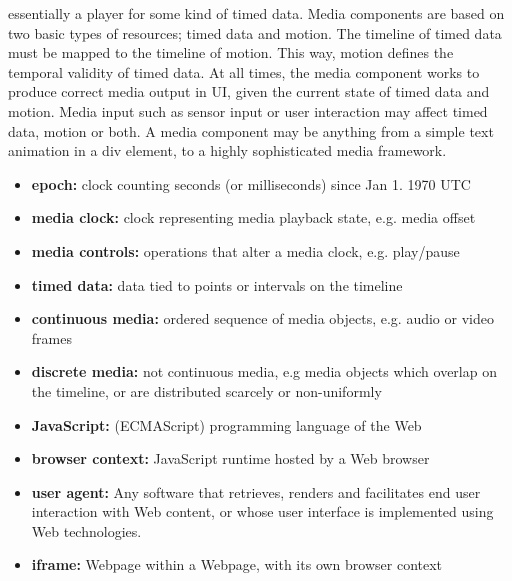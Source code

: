  essentially a player for some kind of timed data. Media components are based on two basic types of resources; timed data and motion. The timeline of timed data must be mapped to the timeline of motion. This way, motion defines the temporal validity of timed data. At all times, the media component works to produce correct media output in UI, given the current state of timed data and motion. Media input such as sensor input or user interaction may affect timed data, motion or both. A media component may be anything from a simple text animation in a div element, to a highly sophisticated media framework.



\begin{itemize}
\item{\textbf{epoch:} clock counting seconds (or milliseconds) since Jan 1. 1970 UTC}
\item{\textbf{media clock:} clock representing media playback state, e.g. media offset}
\item{\textbf{media controls:} operations that alter a media clock, e.g. play/pause}
\item{\textbf{timed data:} data tied to points or intervals on the timeline}
\item{\textbf{continuous media:} ordered sequence of media objects, e.g. audio or video frames}
\item{\textbf{discrete media:} not continuous media, e.g media objects which overlap on the timeline, or are distributed scarcely or non-uniformly}
\item{\textbf{JavaScript:} (ECMAScript) programming language of the Web}
\item{\textbf{browser context:} JavaScript runtime hosted by a Web browser}
\item{\textbf{user agent:} Any software that retrieves, renders and facilitates end user interaction with Web content, or whose user interface is implemented using Web technologies.}
\item{\textbf{iframe:} Webpage within a Webpage, with its own browser context}
\end{itemize}